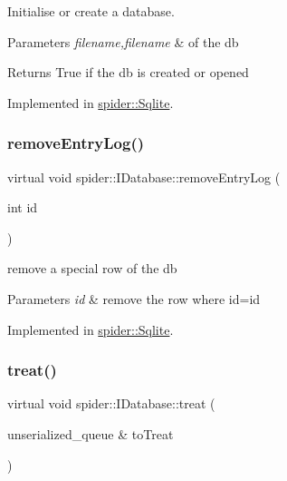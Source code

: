Initialise or create a database. 


\begin{DoxyParams}{Parameters}
{\em filename,filename} & of the db \\
\hline
\end{DoxyParams}
\begin{DoxyReturn}{Returns}
True if the db is created or opened 
\end{DoxyReturn}


Implemented in \hyperlink{classspider_1_1_sqlite_a753bd493b18a804e2533c10f821a714f}{spider\+::\+Sqlite}.

\mbox{\label{classspider_1_1_i_database_a88a6faa9ca865e687de6f62ddb131915}} 
\subsubsection{\texorpdfstring{remove\+Entry\+Log()}{removeEntryLog()}}
{\footnotesize\ttfamily virtual void spider\+::\+I\+Database\+::remove\+Entry\+Log (\begin{DoxyParamCaption}\item[{int}]{id }\end{DoxyParamCaption})\hspace{0.3cm}{\ttfamily [pure virtual]}}



remove a special row of the db 


\begin{DoxyParams}{Parameters}
{\em id} & remove the row where id=id \\
\hline
\end{DoxyParams}


Implemented in \hyperlink{classspider_1_1_sqlite_a62ae99de93b05a3c3282ac42fbc13468}{spider\+::\+Sqlite}.

\mbox{\label{classspider_1_1_i_database_ad5f4a8f7bd0936833d50c126f203a7c5}} 
\subsubsection{\texorpdfstring{treat()}{treat()}}
{\footnotesize\ttfamily virtual void spider\+::\+I\+Database\+::treat (\begin{DoxyParamCaption}\item[{unserialized\+\_\+queue \&}]{to\+Treat }\end{DoxyParamCaption})\hspace{0.3cm}{\ttfamily [pure virtual]}}



